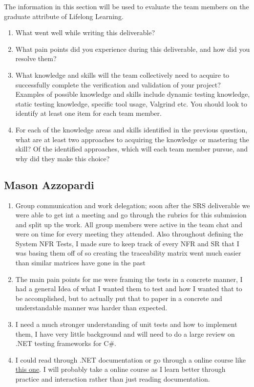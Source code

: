 \documentclass[12pt, titlepage]{article}
\begin{document}
The information in this section will be used to evaluate the team members on the
graduate attribute of Lifelong Learning.



\begin{enumerate}
  \item What went well while writing this deliverable? 
  \item What pain points did you experience during this deliverable, and how
    did you resolve them?
  \item What knowledge and skills will the team collectively need to acquire to
  successfully complete the verification and validation of your project?
  Examples of possible knowledge and skills include dynamic testing knowledge,
  static testing knowledge, specific tool usage, Valgrind etc.  You should look to
  identify at least one item for each team member.
  \item For each of the knowledge areas and skills identified in the previous
  question, what are at least two approaches to acquiring the knowledge or
  mastering the skill?  Of the identified approaches, which will each team
  member pursue, and why did they make this choice?
\end{enumerate}

\subsection*{Mason Azzopardi}
\begin{enumerate}
 \item Group communication and work delegation; soon after the SRS deliverable we were able to get int a meeting and go through the rubrics for this submission and split up the work.
 All group members were active in the team chat and were on time for every meeting they attended. Also throughout defining the System NFR Tests, 
 I made sure to keep track of every NFR and SR that I was basing them off of so creating the traceability matrix went much easier than similar matrices have gone in the past
 \item The main pain points for me were framing the tests in a concrete manner, I had a general Idea of what I wanted them to test and how I wanted that to be accomplished, but to actually put that to paper in a concrete and understandable manner was harder than expected.
 \item I need a much stronger understanding of unit tests and how to implement them, I have very little background and will need to do a large review on .NET testing frameworks for C\#.
 \item I could read through .NET documentation or go through a online course like \href{https://www.coursera.org/learn/packt-complete-guide-to-unit-testing-in-net-core-nunit-and-xunit-zyjqm}{this one}. I will probably take a online course as I learn better through practice and interaction rather than just reading documentation.
\end{enumerate}
\end{document}
